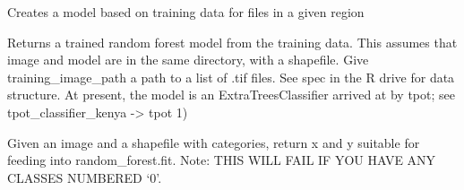 \documentclass[letterpaper,10pt,english]{sphinxmanual}
\begin{document}

\begin{fulllineitems}
\label{\detokenize{index:pyeo.classification.create_model_for_region}}
Creates a model based on training data for files in a given region

\end{fulllineitems}


\begin{fulllineitems}
\label{\detokenize{index:pyeo.classification.create_trained_model}}
Returns a trained random forest model from the training data. This
assumes that image and model are in the same directory, with a shapefile.
Give training\_image\_path a path to a list of .tif files. See spec in the R drive for data structure.
At present, the model is an ExtraTreesClassifier arrived at by tpot; see tpot\_classifier\_kenya -\textgreater{} tpot 1)

\end{fulllineitems}


\begin{fulllineitems}
\label{\detokenize{index:pyeo.classification.get_training_data}}
Given an image and a shapefile with categories, return x and y suitable
for feeding into random\_forest.fit.
Note: THIS WILL FAIL IF YOU HAVE ANY CLASSES NUMBERED ‘0’.

\end{fulllineitems}
\end{document}
